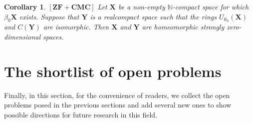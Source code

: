 \documentclass[12pt,twoside,leqno]{article}
\theoremstyle{plain}
\newtheorem{corollary}[theorem]{Corollary}
\theoremstyle{definition}
\theoremstyle{remark}
\begin{document}
\begin{corollary}
	\label{s10:c4}
	$[\mathbf{ZF+CMC}]$ 
	Let $\mathbf{X}$ be a non-empty $\mathbb{N}$-compact space for which $\beta_0\mathbf{X}$ exists. Suppose that $\mathbf{Y}$ is a realcompact space such that the rings $U_{\aleph_0}(\mathbf{X})$ and $C(\mathbf{Y})$ are isomorphic. Then $\mathbf{X}$ and $\mathbf{Y}$ are homeomorphic strongly zero-dimensional spaces.
\end{corollary}

\section{The shortlist of open problems}
\label{s11}

Finally, in this section,  for the convenience of readers, we collect the open problems posed in the previous sections and add several new ones to show possible directions for future research in this field.
\end{document}
